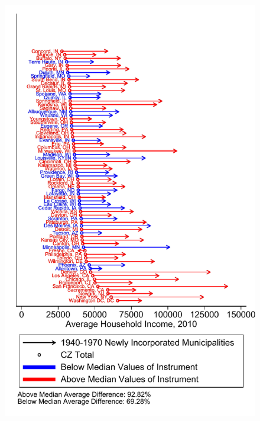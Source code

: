 \documentclass{article}
\begin{document}
\begin{figure}
	\includegraphics{figures/pcarrow_figure_inc2010.pdf}
\end{figure}
\clearpage
\end{document}
